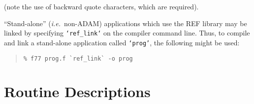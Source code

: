 \documentclass[twoside,11pt]{article}
\newcommand{\xlabel}[1]{}
\begin{document}
(note the use of backward quote characters, which are required).

``Stand-alone'' (\emph{i.e.}\ non-ADAM) applications which use the REF library
may be linked by specifying \texttt{`ref\_link`} on the compiler
command line. Thus, to compile and link a stand-alone application
called \texttt{`prog'}, the following might be used:

\begin{quote}
\begin{verbatim}
% f77 prog.f `ref_link` -o prog
\end{verbatim}
\end{quote}


\appendix
\cleardoublepage
\section{\xlabel{routine_descriptions}Routine Descriptions}
\label{routine_descriptions}
\end{document}
